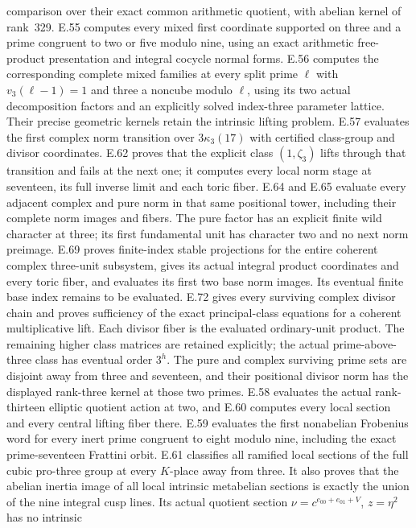 comparison over their exact common arithmetic quotient,
with abelian kernel of rank~329. E.55 computes every mixed first
coordinate supported on three and a prime congruent to
two or five modulo nine, using an exact arithmetic
free-product presentation and integral cocycle normal forms.
E.56 computes the corresponding complete mixed families at
every split prime $\ell$ with $v_3(\ell-1)=1$ and three a
noncube modulo $\ell$, using its two actual decomposition
factors and an explicitly solved index-three parameter lattice.
Their precise geometric kernels retain the intrinsic
lifting problem.
E.57 evaluates the first complex norm transition over
$3\kappa_3(17)$ with certified class-group and divisor
coordinates. E.62 proves that the explicit class $(1,\zeta_3)$
lifts through that transition and fails at the next one;
it computes every local norm stage at seventeen, its full
inverse limit and each toric fiber. E.64 and E.65 evaluate
every adjacent complex and pure norm in that same positional
tower, including their complete norm images and fibers.
The pure factor has an explicit finite wild character at three;
its first fundamental unit has character two and no next
norm preimage. E.69 proves finite-index stable projections for
the entire coherent complex three-unit subsystem, gives its
actual integral product coordinates and every toric fiber, and
evaluates its first two base norm images. Its eventual finite
base index remains to be evaluated. E.72 gives every surviving
complex divisor chain and proves sufficiency of the exact
principal-class equations for a coherent multiplicative lift.
Each divisor fiber is the evaluated ordinary-unit product.
The remaining higher class matrices are retained explicitly;
the actual prime-above-three class has eventual order $3^h$.
The pure and complex surviving prime sets are disjoint away
from three and seventeen, and their positional divisor norm
has the displayed rank-three kernel at those two primes.
E.58 evaluates the actual
rank-thirteen elliptic quotient action at two, and E.60
computes every local section and every central lifting fiber
there. E.59 evaluates the first nonabelian Frobenius word
for every inert prime congruent to eight modulo nine,
including the exact prime-seventeen Frattini orbit.
E.61 classifies all ramified local sections of the full
cubic pro-three group at every $K$-place away from three.
It also proves that the abelian inertia image of all local
intrinsic metabelian sections is exactly the union of the
nine integral cusp lines. Its actual quotient section
$\nu=c^{e_{00}+e_{01}+V}$, $z=\eta^2$ has no intrinsic
